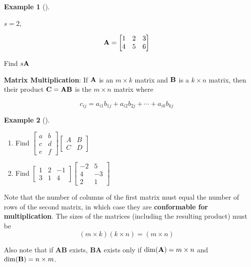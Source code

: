 \documentclass[
  letterpaper,
]{book}
\theoremstyle{definition}
\theoremstyle{definition}
\newtheorem{example}{Example}[chapter]
\theoremstyle{plain}
\theoremstyle{definition}
\theoremstyle{plain}
\theoremstyle{plain}
\theoremstyle{remark}
\begin{document}
\leavevmode{}%
\begin{example}[]\label{exm-scalarmulti}

\(s=2\),

\[{\bf A}=\begin{bmatrix} 1 & 2 & 3 \\ 4 & 5 & 6 \end{bmatrix}\]

Find \(s {\bf A}\)

\end{example}

\textbf{Matrix Multiplication}: If \({\bf A}\) is an \(m\times k\)
matrix and \(\bf B\) is a \(k\times n\) matrix, then their product
\(\bf C = A B\) is the \(m\times n\) matrix where

\[c_{ij}=a_{i1}b_{1j}+a_{i2}b_{2j}+\cdots+a_{ik}b_{kj}\]

\leavevmode{}%
\begin{example}[]\label{exm-matrixmulti}

\begin{enumerate}
\def\labelenumi{\arabic{enumi}.}
\item
  Find
  \(\begin{bmatrix} a&b\\c&d\\e&f \end{bmatrix} \begin{bmatrix} A&B\\C&D \end{bmatrix}\)
\item
  Find
  \(\begin{bmatrix} 1&2&-1\\3&1&4 \end{bmatrix} \begin{bmatrix} -2&5\\4&-3\\2&1\end{bmatrix}\)
\end{enumerate}

\end{example}

Note that the number of columns of the first matrix must equal the
number of rows of the second matrix, in which case they are
\textbf{conformable for multiplication}. The sizes of the matrices
(including the resulting product) must be
\[(m\times k)(k\times n)=(m\times n)\]

Also note that if \textbf{AB} exists, \textbf{BA} exists only if
\(\dim({\bf A}) = m \times n\) and \(\dim({\bf B}) = n \times m\).
\end{document}
